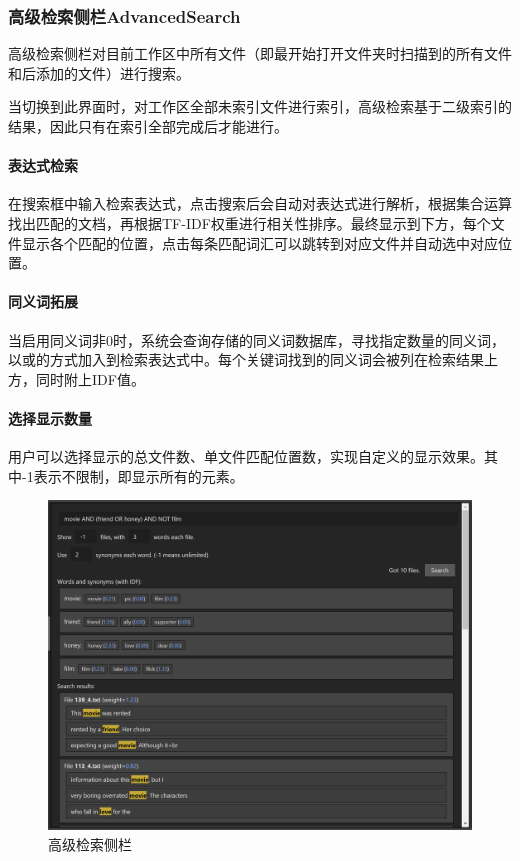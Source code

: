 \documentclass[scheme = chinese]{ctexart}
\begin{document}
\subsubsection{高级检索侧栏AdvancedSearch}
高级检索侧栏对目前工作区中所有文件（即最开始打开文件夹时扫描到的所有文件和后添加的文件）进行搜索。

当切换到此界面时，对工作区全部未索引文件进行索引，高级检索基于二级索引的结果，因此只有在索引全部完成后才能进行。

\paragraph{表达式检索}
在搜索框中输入检索表达式，点击搜索后会自动对表达式进行解析，根据集合运算找出匹配的文档，再根据TF-IDF权重进行相关性排序。最终显示到下方，每个文件显示各个匹配的位置，点击每条匹配词汇可以跳转到对应文件并自动选中对应位置。

\paragraph{同义词拓展}
当启用同义词非0时，系统会查询存储的同义词数据库，寻找指定数量的同义词，以或的方式加入到检索表达式中。每个关键词找到的同义词会被列在检索结果上方，同时附上IDF值。

\paragraph{选择显示数量}
用户可以选择显示的总文件数、单文件匹配位置数，实现自定义的显示效果。其中-1表示不限制，即显示所有的元素。

\begin{figure}[h]
    \centering
    \includegraphics[width=\textwidth]{images/AdvancedSearch.png}
    \caption{高级检索侧栏}
\end{figure}
\end{document}
